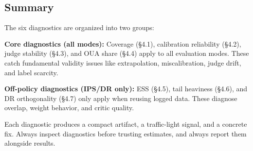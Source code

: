 \subsection{Summary}

The six diagnostics are organized into two groups:

\textbf{Core diagnostics (all modes):} Coverage (§4.1), calibration reliability (§4.2), judge stability (§4.3), and OUA share (§4.4) apply to all evaluation modes. These catch fundamental validity issues like extrapolation, miscalibration, judge drift, and label scarcity.

\textbf{Off-policy diagnostics (IPS/DR only):} ESS (§4.5), tail heaviness (§4.6), and DR orthogonality (§4.7) only apply when reusing logged data. These diagnose overlap, weight behavior, and critic quality.

Each diagnostic produces a compact artifact, a traffic-light signal, and a concrete fix. Always inspect diagnostics before trusting estimates, and always report them alongside results.
